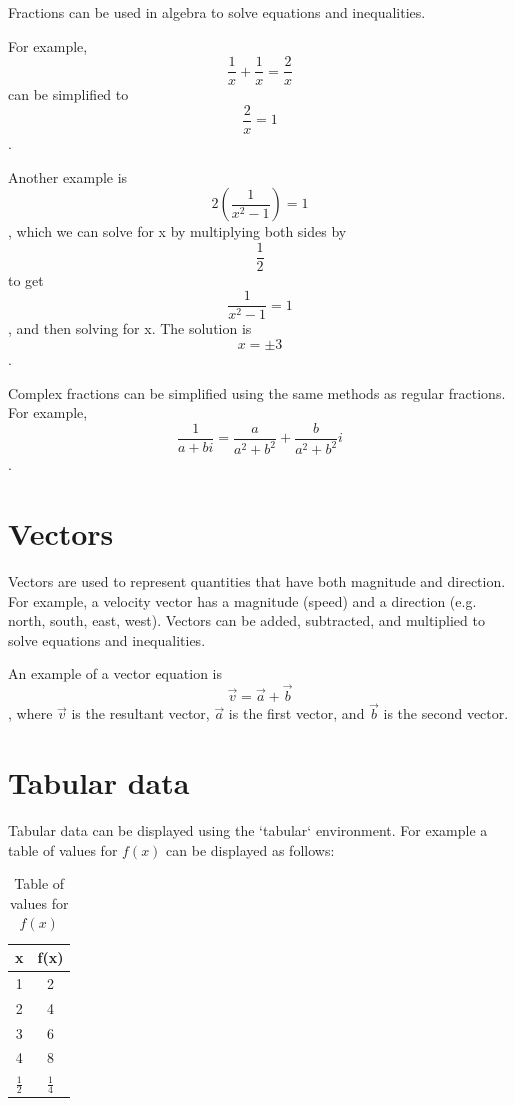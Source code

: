 \documentclass{article}
\begin{document}
Fractions can be used in algebra to solve equations and inequalities.

For example, $$\frac{1}{x} + \frac{1}{x} = \frac{2}{x}$$ can be simplified to $$\frac{2}{x} = 1$$.

Another example is $$2\left(\frac{1}{x^2-1}\right) = 1$$, which we can solve for x by multiplying both sides by $$\frac{1}{2}$$ to get $$\frac{1}{x^2-1} = 1$$, and then solving for x.
The solution is $$x = \pm 3$$.

Complex fractions can be simplified using the same methods as regular fractions. For example, $$\frac{1}{a+bi} = \frac{a}{a^2+b^2} + \frac{b}{a^2+b^2}i$$.


\section{Vectors}

Vectors are used to represent quantities that have both magnitude and direction. For example, a velocity vector has a magnitude (speed) and a direction (e.g. north, south, east, west).
Vectors can be added, subtracted, and multiplied to solve equations and inequalities.

An example of a vector equation is $$\vec{v} = \vec{a} + \vec{b}$$, where $\vec{v}$ is the resultant vector, $\vec{a}$ is the first vector, and $\vec{b}$ is the second vector.

\section{Tabular data}

Tabular data can be displayed using the `tabular` environment. For example a table of values for $f(x)$ can be displayed as follows:

\begin{table}[H]
\centering
\def \arraystretch{2}
\begin{tabular}{||c|c|}
    \hline
    x & f(x) \\
    \hline
    1 &  2 \\
    \hline
    2 &  4 \\
    \hline
    3 &  6 \\
    \hline
    4 &  8 \\
    \hline
    $\frac{1}{2}$ &  $\frac{1}{4}$ \\
    \hline


\end{tabular}
\caption{Table of values for $f(x)$}
\label{tab:f(x)}

\end{table}
\end{document}
